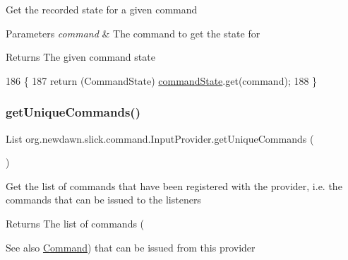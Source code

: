 Get the recorded state for a given command


\begin{DoxyParams}{Parameters}
{\em command} & The command to get the state for \\
\hline
\end{DoxyParams}
\begin{DoxyReturn}{Returns}
The given command state 
\end{DoxyReturn}

\begin{DoxyCode}
186                                                    \{
187         \textcolor{keywordflow}{return} (CommandState) \mbox{\hyperlink{classorg_1_1newdawn_1_1slick_1_1command_1_1_input_provider_a343fea436b5ad6194968443cc58a632d}{commandState}}.get(command);
188     \}
\end{DoxyCode}
\mbox{\label{classorg_1_1newdawn_1_1slick_1_1command_1_1_input_provider_a34d5aff64cb457846fb408caf1f05bf1}} 
\subsubsection{\texorpdfstring{get\+Unique\+Commands()}{getUniqueCommands()}}
{\footnotesize\ttfamily List org.\+newdawn.\+slick.\+command.\+Input\+Provider.\+get\+Unique\+Commands (\begin{DoxyParamCaption}{ }\end{DoxyParamCaption})\hspace{0.3cm}{\ttfamily [inline]}}

Get the list of commands that have been registered with the provider, i.\+e. the commands that can be issued to the listeners

\begin{DoxyReturn}{Returns}
The list of commands (
\end{DoxyReturn}
\begin{DoxySeeAlso}{See also}
\mbox{\hyperlink{interfaceorg_1_1newdawn_1_1slick_1_1command_1_1_command}{Command}}) that can be issued from this provider 
\end{DoxySeeAlso}

